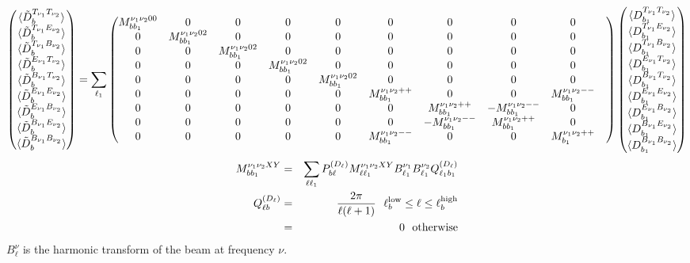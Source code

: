 \documentclass[a4paper, 11pt]{article}
\def\ba{\begin{eqnarray}}
\def\ea{\end{eqnarray}}
\begin{document}
\tiny
\ba
 \begin{pmatrix} \langle \tilde{D}^{T_{\nu_{1}}T_{\nu_{2}}}_{b} \rangle  \cr \langle \tilde{D}^{T_{\nu_{1}}E_{\nu_{2}}}_{b} \rangle  \cr \langle \tilde{D}^{T_{\nu_{1}}B_{\nu_{2}}}_{b} \rangle  \cr \langle \tilde{D}^{E_{\nu_{1}}T_{\nu_{2}}}_{b} \rangle  \cr \langle \tilde{D}^{B_{\nu_{1}}T_{\nu_{2}}}_{b} \rangle  \cr \langle \tilde{D}^{E_{\nu_{1}}E_{\nu_{2}}}_{b} \rangle  \cr \langle \tilde{D}^{E_{\nu_{1}}B_{\nu_{2}}}_{b} \rangle \cr  \langle \tilde{D}^{B_{\nu_{1}}E_{\nu_{2}}}_{b} \rangle \cr \langle \tilde{D}^{B_{\nu_{1}}B_{\nu_{2}}}_{b} \rangle \end{pmatrix} = \sum_{\ell_{1}}
\begin{pmatrix} 
M^{\nu_{1}\nu_{2}00}_{bb_{1}} & 0 &0 &0 &0 &0 &0 &0 &0 &
\cr
0 & M^{\nu_{1}\nu_{2}02}_{bb_{1}} & 0 &0 &0 &0 &0 &0 &0 &
\cr
0 &0 & M^{\nu_{1}\nu_{2}02}_{bb_{1}} &0 &0 &0 &0 &0 &0 &
\cr
0 &0 & 0 & M^{\nu_{1}\nu_{2}02}_{bb_{1}} &0 &0 &0 &0 &0 &
\cr
0 &0 & 0 &0 & M^{\nu_{1}\nu_{2}02}_{bb_{1}} &0 &0 &0 &0 &
\cr
0 &0 &0 &0 &0 & M^{\nu_{1}\nu_{2}++}_{bb_{1}} & 0 &0 & M^{\nu_{1}\nu_{2}--}_{bb_{1}} &
\cr
0 &0 &0 &0 &0 &0 & M^{\nu_{1}\nu_{2}++}_{bb_{1}} &-M^{\nu_{1}\nu_{2}--}_{bb_{1}} & 0 &
\cr
0 & 0 & 0 & 0 & 0 & 0&  -M^{\nu_{1}\nu_{2}--}_{bb_{1}}  & M^{\nu_{1}\nu_{2}++}_{bb_{1}}  & 0&
\cr
0 & 0 & 0 & 0 & 0 & M^{\nu_{1}\nu_{2}--}_{bb_{1}} &  0 & 0 & M^{\nu_{1}\nu_{2}++}_{b_{1}} &
\end{pmatrix}
\begin{pmatrix} \langle D^{T_{\nu_{1}}T_{\nu_{2}}}_{b_{1}} \rangle  \cr \langle D^{T_{\nu_{1}}E_{\nu_{2}}}_{b_{1}} \rangle  \cr \langle D^{T_{\nu_{1}}B_{\nu_{2}}}_{b_{1}} \rangle  \cr \langle D^{E_{\nu_{1}}T_{\nu_{2}}}_{b_{1}} \rangle  \cr \langle D^{B_{\nu_{1}}T_{\nu_{2}}}_{b_{1}} \rangle  \cr \langle D^{E_{\nu_{1}}E_{\nu_{2}}}_{b_{1}} \rangle  \cr \langle D^{E_{\nu_{1}}B_{\nu_{2}}}_{b_{1}} \rangle \cr  \langle D^{B_{\nu_{1}}E_{\nu_{2}}}_{b_{1}} \rangle \cr \langle D^{B_{\nu_{1}}B_{\nu_{2}}}_{b_{1}} \rangle \end{pmatrix}\ea
\normalsize
\ba
M^{\nu_{1}\nu_{2}XY}_{bb_{1}} &=& \sum_{\ell \ell_{1}} P^{(D_{\ell})}_{b \ell} M^{\nu_{1}\nu_{2}XY}_{\ell \ell_{1}} B^{\nu_{1}}_{\ell_{1}}B^{\nu_{2}}_{\ell_{1}}  Q^{(D_{\ell})}_{\ell_{1}b_{1}} \\
Q^{(D_{\ell})}_{\ell b} &=& \frac{2\pi}{\ell (\ell+1)}  \ \ \ell^{\rm low}_{b} \le \ell \le \ell^{\rm high}_{b} \nonumber \\
&=& 0 \ \ {\rm otherwise} \nonumber \\
\ea
$B^{\nu}_{\ell}$ is the harmonic transform of the beam at frequency $\nu$.
\end{document}
